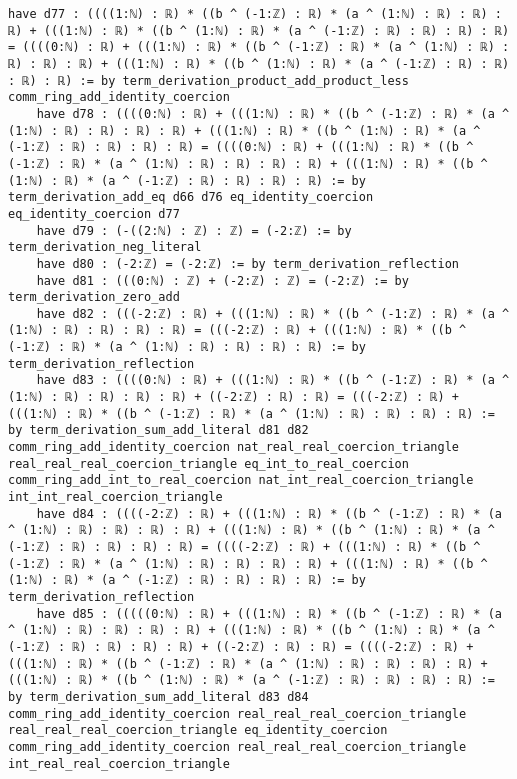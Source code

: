\documentclass{article}
\begin{document}
\begin{tcolorbox}[colback=white!10, width=\linewidth]
\begin{lstlisting}[language=Lean4]
    have d77 : ((((1:ℕ) : ℝ) * ((b ^ (-1:ℤ) : ℝ) * (a ^ (1:ℕ) : ℝ) : ℝ) : ℝ) + (((1:ℕ) : ℝ) * ((b ^ (1:ℕ) : ℝ) * (a ^ (-1:ℤ) : ℝ) : ℝ) : ℝ) : ℝ) = ((((0:ℕ) : ℝ) + (((1:ℕ) : ℝ) * ((b ^ (-1:ℤ) : ℝ) * (a ^ (1:ℕ) : ℝ) : ℝ) : ℝ) : ℝ) + (((1:ℕ) : ℝ) * ((b ^ (1:ℕ) : ℝ) * (a ^ (-1:ℤ) : ℝ) : ℝ) : ℝ) : ℝ) := by term_derivation_product_add_product_less comm_ring_add_identity_coercion
    have d78 : ((((0:ℕ) : ℝ) + (((1:ℕ) : ℝ) * ((b ^ (-1:ℤ) : ℝ) * (a ^ (1:ℕ) : ℝ) : ℝ) : ℝ) : ℝ) + (((1:ℕ) : ℝ) * ((b ^ (1:ℕ) : ℝ) * (a ^ (-1:ℤ) : ℝ) : ℝ) : ℝ) : ℝ) = ((((0:ℕ) : ℝ) + (((1:ℕ) : ℝ) * ((b ^ (-1:ℤ) : ℝ) * (a ^ (1:ℕ) : ℝ) : ℝ) : ℝ) : ℝ) + (((1:ℕ) : ℝ) * ((b ^ (1:ℕ) : ℝ) * (a ^ (-1:ℤ) : ℝ) : ℝ) : ℝ) : ℝ) := by term_derivation_add_eq d66 d76 eq_identity_coercion eq_identity_coercion d77
    have d79 : (-((2:ℕ) : ℤ) : ℤ) = (-2:ℤ) := by term_derivation_neg_literal
    have d80 : (-2:ℤ) = (-2:ℤ) := by term_derivation_reflection
    have d81 : (((0:ℕ) : ℤ) + (-2:ℤ) : ℤ) = (-2:ℤ) := by term_derivation_zero_add
    have d82 : (((-2:ℤ) : ℝ) + (((1:ℕ) : ℝ) * ((b ^ (-1:ℤ) : ℝ) * (a ^ (1:ℕ) : ℝ) : ℝ) : ℝ) : ℝ) = (((-2:ℤ) : ℝ) + (((1:ℕ) : ℝ) * ((b ^ (-1:ℤ) : ℝ) * (a ^ (1:ℕ) : ℝ) : ℝ) : ℝ) : ℝ) := by term_derivation_reflection
    have d83 : ((((0:ℕ) : ℝ) + (((1:ℕ) : ℝ) * ((b ^ (-1:ℤ) : ℝ) * (a ^ (1:ℕ) : ℝ) : ℝ) : ℝ) : ℝ) + ((-2:ℤ) : ℝ) : ℝ) = (((-2:ℤ) : ℝ) + (((1:ℕ) : ℝ) * ((b ^ (-1:ℤ) : ℝ) * (a ^ (1:ℕ) : ℝ) : ℝ) : ℝ) : ℝ) := by term_derivation_sum_add_literal d81 d82 comm_ring_add_identity_coercion nat_real_real_coercion_triangle real_real_real_coercion_triangle eq_int_to_real_coercion comm_ring_add_int_to_real_coercion nat_int_real_coercion_triangle int_int_real_coercion_triangle
    have d84 : ((((-2:ℤ) : ℝ) + (((1:ℕ) : ℝ) * ((b ^ (-1:ℤ) : ℝ) * (a ^ (1:ℕ) : ℝ) : ℝ) : ℝ) : ℝ) + (((1:ℕ) : ℝ) * ((b ^ (1:ℕ) : ℝ) * (a ^ (-1:ℤ) : ℝ) : ℝ) : ℝ) : ℝ) = ((((-2:ℤ) : ℝ) + (((1:ℕ) : ℝ) * ((b ^ (-1:ℤ) : ℝ) * (a ^ (1:ℕ) : ℝ) : ℝ) : ℝ) : ℝ) + (((1:ℕ) : ℝ) * ((b ^ (1:ℕ) : ℝ) * (a ^ (-1:ℤ) : ℝ) : ℝ) : ℝ) : ℝ) := by term_derivation_reflection
    have d85 : (((((0:ℕ) : ℝ) + (((1:ℕ) : ℝ) * ((b ^ (-1:ℤ) : ℝ) * (a ^ (1:ℕ) : ℝ) : ℝ) : ℝ) : ℝ) + (((1:ℕ) : ℝ) * ((b ^ (1:ℕ) : ℝ) * (a ^ (-1:ℤ) : ℝ) : ℝ) : ℝ) : ℝ) + ((-2:ℤ) : ℝ) : ℝ) = ((((-2:ℤ) : ℝ) + (((1:ℕ) : ℝ) * ((b ^ (-1:ℤ) : ℝ) * (a ^ (1:ℕ) : ℝ) : ℝ) : ℝ) : ℝ) + (((1:ℕ) : ℝ) * ((b ^ (1:ℕ) : ℝ) * (a ^ (-1:ℤ) : ℝ) : ℝ) : ℝ) : ℝ) := by term_derivation_sum_add_literal d83 d84 comm_ring_add_identity_coercion real_real_real_coercion_triangle real_real_real_coercion_triangle eq_identity_coercion comm_ring_add_identity_coercion real_real_real_coercion_triangle int_real_real_coercion_triangle

\end{lstlisting}
\end{tcolorbox}
\end{document}
